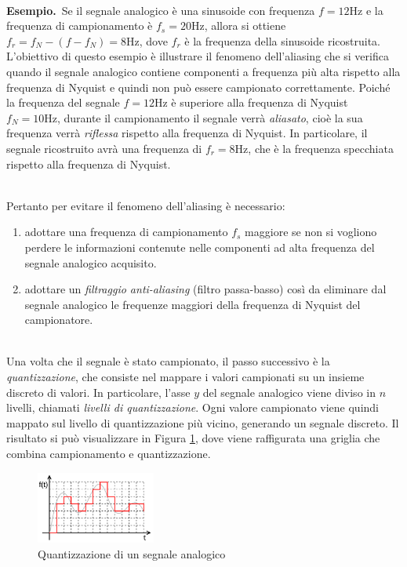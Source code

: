\documentclass[a4paper,12pt]{report}  %
\newcommand{\namedparagraph}[2]{%
    \noindent\colorbox{cyan!20}{\parbox{\dimexpr\linewidth-2\fboxsep}{\textbf{#1}~#2}}%
}
\begin{document}
\noindent\\ \namedparagraph{Esempio.}{Se il segnale analogico è una sinusoide con frequenza $f = 12 \text{Hz}$ e la frequenza di campionamento è $f_s = 20 \text{Hz}$, allora si ottiene $f_r = f_N - (f - f_N) = 8 \text{Hz}$, dove $f_r$ è la frequenza della sinusoide ricostruita.
L'obiettivo di questo esempio è illustrare il fenomeno dell'aliasing che si verifica quando il segnale analogico contiene componenti a frequenza più alta rispetto alla frequenza di Nyquist e quindi non può essere campionato correttamente.
Poiché la frequenza del segnale $f = 12 \text{Hz}$ è superiore alla frequenza di Nyquist $f_N = 10 \text{Hz}$, durante il campionamento il segnale verrà \textit{aliasato}, cioè la sua frequenza verrà \textit{riflessa} rispetto alla frequenza di Nyquist.
In particolare, il segnale ricostruito avrà una frequenza di $f_r = 8 \text{Hz}$, che è la frequenza specchiata rispetto alla frequenza di Nyquist.

\noindent\\ Pertanto per evitare il fenomeno dell'aliasing è necessario:
\begin{enumerate}
    \item adottare una frequenza di campionamento $f_s$ maggiore se non si vogliono perdere le informazioni contenute nelle componenti ad alta frequenza del segnale analogico acquisito.
    \item adottare un \textit{filtraggio anti-aliasing} (filtro passa-basso) così da eliminare dal segnale analogico le frequenze maggiori della frequenza di Nyquist del campionatore.
\end{enumerate}
}

\noindent\\ Una volta che il segnale è stato campionato, il passo successivo è la \textit{quantizzazione}, che consiste nel mappare i valori campionati su un insieme discreto di valori.
In particolare, l'asse $y$ del segnale analogico viene diviso in $n$ livelli, chiamati \textit{livelli di quantizzazione}.
Ogni valore campionato viene quindi mappato sul livello di quantizzazione più vicino, generando un segnale discreto.
Il risultato si può visualizzare in Figura \ref{fig:quantization}, dove viene raffigurata una griglia che combina campionamento e quantizzazione.

\begin{figure}[h]
    \centering
    \includegraphics[width=0.35\textwidth]{imgs/Quantization.png}
    \caption{Quantizzazione di un segnale analogico}
    \label{fig:quantization}
\end{figure}
\end{document}
